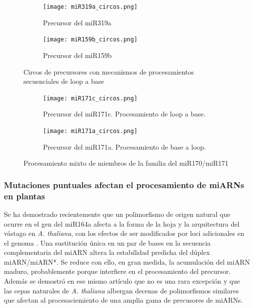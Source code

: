 \begin{landscape}
	\begin{figure}
	\centering
	\begin{subfigure}{.75\textwidth}
 \centering
 \texttt{[image: miR319a\_circos.png]}
 \caption{Precursor del miR319a}
 \label{subfig:miR319a_circos}
	\end{subfigure}%
	\begin{subfigure}{.75\textwidth}
 \centering
 \texttt{[image: miR159b\_circos.png]}
 \caption{Precursor del miR159b}
 \label{subfig:miR159b_circos}
	\end{subfigure}
	\caption{Circos de precursores con mecanismos de procesamientos secuenciales de loop a base}
	\label{fig:seqLTBL_circos}
	\end{figure}
\end{landscape}



\begin{landscape}
	\begin{figure}
	\centering
	\begin{subfigure}{.65\textwidth}
 \centering
 \texttt{[image: miR171c\_circos.png]}
 \caption{Precursor del miR171c. Procesamiento de loop a base. }
 \label{subfig:miR171c_circos}
	\end{subfigure}
	\begin{subfigure}{.65\textwidth}
 \centering
 \texttt{[image: miR171a\_circos.png]}
 \caption{Precursor del miR171a. Procesamiento de base a loop.}
 \label{subfig:miR171a_circos}
	\end{subfigure}
	\caption{Procesamiento mixto de miembros de la familia del miR170/miR171}
	\label{fig:familia_miR171_circos}
	\end{figure}
\end{landscape}


\subsubsection{Mutaciones puntuales afectan el procesamiento de miARNs en plantas}

Se ha demostrado recientemente que un polimorfismo de origen natural que ocurre en el gen del miR164a afecta a la forma de la hoja y la arquitectura del vástago en \textit{A. thaliana}, con los efectos de ser modificados por loci adicionales en el genoma \citep{pmid22206705}.
Una sustitución única en un par de bases en la secuencia complementaria del miARN altera la estabilidad predicha del dúplex miARN/miARN*.
Se reduce con ello, en gran medida, la acumulación del miARN maduro, probablemente porque interfiere en el procesamiento del precursor.
Además se demostró en ese mismo artículo que no es una rara excepción y que las cepas naturales de \textit{A. thaliana} albergan decenas de polimorfismos similares que afectan al procesaciemiento de una amplia gama de precusores de miARNs.

